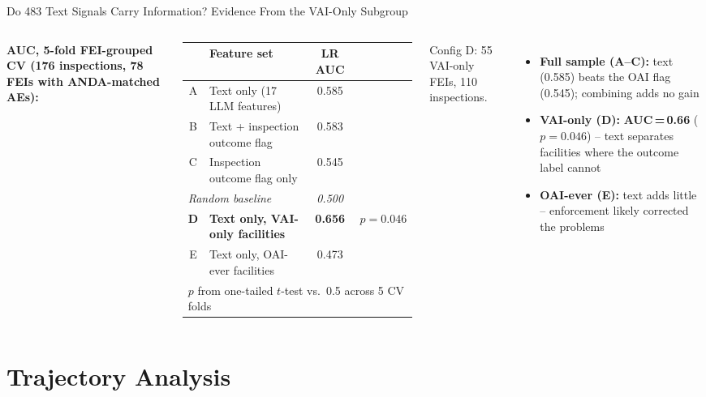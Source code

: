 \documentclass[aspectratio=169,10pt]{beamer}
\newcommand{\highlight}[1]{{\color{ncsuRed}\textbf{#1}}}
\begin{document}
\begin{frame}{Do 483 Text Signals Carry Information? Evidence From the VAI-Only Subgroup}
\begin{columns}[T]
\textbf{AUC, 5-fold FEI-grouped CV (176 inspections, 78 FEIs with ANDA-matched AEs):}

\vspace{4pt}
{\small
\begin{tabular}{clcc}
\toprule
 & Feature set & LR AUC & \\
\midrule
A & Text only (17 LLM features) & 0.585 & \\
B & Text + inspection outcome flag & 0.583 & \\
C & Inspection outcome flag only & 0.545 & \\
\midrule
\multicolumn{2}{l}{\textit{Random baseline}} & \textit{0.500} & \\
\midrule
\pause
\highlight{D} & \highlight{Text only, VAI-only facilities} & \highlight{0.656} & $p{=}0.046$ \\
E & Text only, OAI-ever facilities & 0.473 & \\
\bottomrule
\multicolumn{4}{l}{\scriptsize $p$ from one-tailed $t$-test vs.\ 0.5 across 5 CV folds}
\end{tabular}
}

\vspace{4pt}
{\small Config D: 55 VAI-only FEIs, 110 inspections.}

\hfill{}
\begin{itemize}
  \setlength{\itemsep}{7pt}
  \item \textbf{Full sample (A--C):} text (0.585) beats the OAI flag (0.545); combining adds no gain
  \pause
  \item \textbf{VAI-only (D):} \highlight{AUC\,=\,0.66} ($p{=}0.046$) -- text separates facilities where the outcome label cannot
  \pause
  \item \textbf{OAI-ever (E):} text adds little -- enforcement likely corrected the problems
\end{itemize}
\end{columns}
\end{frame}

\section{Trajectory Analysis}
\end{document}
